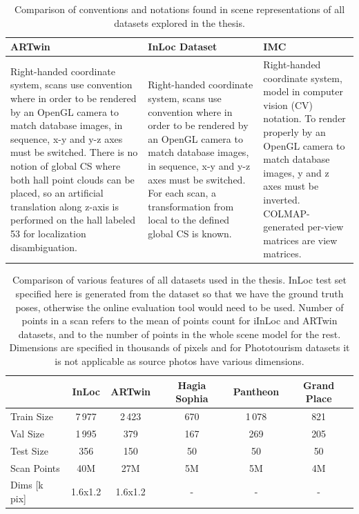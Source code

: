 \begin{table}
\caption[Comparison of conventions and notations found in scene representations of all
datasets explored in the thesis]{Comparison of conventions and notations found
in scene representations of all datasets explored in the thesis.}
\centering
    \begin{tabular}{p{4cm} p{4cm} p{4cm}}
    \toprule
    ARTwin & InLoc Dataset & IMC \\
    \midrule
    Right-handed coordinate system, scans use convention where in order to be
    rendered by an OpenGL camera to match database images, in sequence, x-y and y-z axes
    must be switched. There is no notion of global CS where both hall point clouds can be
    placed, so an artificial translation along z-axis is performed on the hall labeled 53
    for localization disambiguation. & Right-handed coordinate system, scans use
    convention where in order to be rendered by an OpenGL camera to match database images,
    in sequence, x-y and y-z axes must be switched. For each scan, a transformation from
    local to the defined global CS is known. & Right-handed coordinate system, model in computer vision (CV)
    notation. To render properly by an OpenGL camera to match database images, y and z
    axes must be inverted.  COLMAP-generated per-view matrices are view matrices.\\
    \bottomrule
    \end{tabular}
\label{tab:model_conventions}
\end{table}

\begin{table}
\caption[Comparison of various features of all datasets used in the thesis]{
Comparison of various features of all datasets used in the thesis.
InLoc test set specified here is generated from the dataset so that we have the ground
truth poses, otherwise the online evaluation tool would need to be used. Number of points
in a scan refers to the mean of points count for iInLoc and ARTwin datasets, and to the
number of points in the whole scene model for the rest. Dimensions are specified in
thousands of pixels and for Phototourism datasets it is not applicable as source photos
have various dimensions.}
\centering
    \begin{tabular}{l c c c c c}
    \toprule
     & InLoc & ARTwin & Hagia Sophia & Pantheon & Grand Place\\
    \midrule
    Train Size  &	7\,977 	& 2\,423    & 670 & 1\,078  & 821\\
    Val Size    &	1\,995	& 379       & 167 & 269     & 205\\
    Test Size   &	356	    & 150       & 50  & 50		& 50\\
    Scan Points	&   40M     & 27M       & 5M  & 5M		& 4M\\
    Dims [k pix]& 1.6x1.2	& 1.6x1.2	& -   & -		& -\\
    \bottomrule
    \end{tabular}
\label{tab:datasets}
\end{table}
